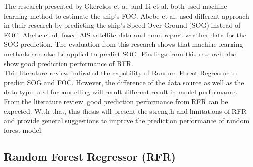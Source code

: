 The research presented by Gkerekos et al. \cite{Gkerekos.2019} and Li et al. \cite{Li.2022} both used machine learning method to estimate the ship's FOC. Abebe et al. \cite{Abebe.2020} used different approach in their research by predicting the ship's Speed Over Ground (SOG) instead of FOC. Abebe et al. \cite{Abebe.2020} fused AIS satellite data and noon-report weather data for the SOG prediction. The evaluation from this research shows that machine learning methods can also be applied to predict SOG. Findings from this research also show good prediction performance of RFR.\\

This literature review indicated the capability of Random Forest Regressor to predict SOG and FOC. However, the difference of the data source as well as the data type used for modelling will result different result in model performance. From the literature review, good prediction performance from RFR can be expected. With that, this thesis will present the strength and limitations of RFR and provide general suggestions to improve the prediction performance of random forest model.\\

\subsection{Random Forest Regressor (RFR)}\label{rfrtheo}


